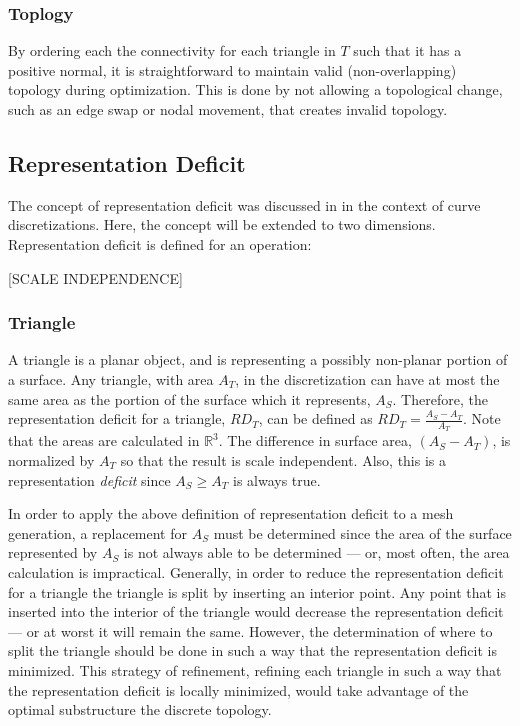 \subsubsection{Toplogy}
By ordering each the connectivity for each triangle in $T$ such that it
has a positive normal, it is straightforward to maintain valid
(non-overlapping) topology during optimization. This is done by not
allowing a topological change, such as an edge swap or nodal movement,
that creates invalid topology.

\subsection{Representation Deficit}
The concept of representation deficit was discussed in \cite{mclaurin13} in the
context of curve discretizations. Here, the concept will be extended to
two dimensions. Representation deficit is defined for an operation:

[SCALE INDEPENDENCE]

\subsubsection{Triangle}
A triangle is a planar object, and is representing a possibly non-planar
portion of a surface. Any triangle, with area $A_T$, in the
discretization can have at most the same area as the portion of the
surface which it represents, $A_S$. Therefore, the representation
deficit for a triangle, $RD_T$, can be defined as $RD_T = \frac{A_S -
A_T}{A_T}$. Note that the areas are calculated in ${\mathbb R}^3$. The
difference in surface area, $\left(A_S - A_T\right)$, is normalized by
$A_T$ so that the result is scale independent. Also, this is a
representation {\it deficit} since $A_S \ge A_T$ is always true.

In order to apply the above definition of representation deficit to a
mesh generation, a replacement for $A_S$ must be determined since the
area of the surface represented by $A_S$ is not always able to be
determined --- or, most often, the area calculation is impractical.
Generally, in order to reduce the representation deficit for a triangle
the triangle is split by inserting an interior point. Any point that is
inserted into the interior of the triangle would decrease the
representation deficit --- or at worst it will remain the same. However,
the determination of where to split the triangle should be done in such
a way that the representation deficit is minimized. This strategy of
refinement, refining each triangle in such a way that the representation
deficit is locally minimized,  would take advantage of the optimal
substructure the discrete topology.

